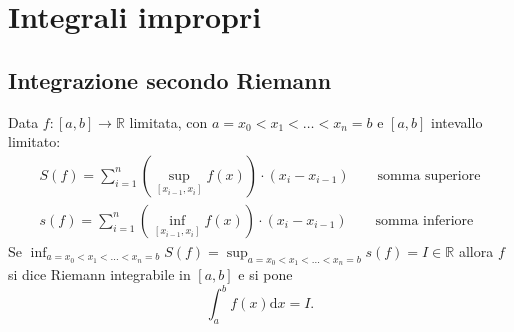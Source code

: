 \section{Integrali impropri}
\subsection{Integrazione secondo Riemann}

Data $f:[a,b] \rightarrow \mathbb{R}$ limitata, con $a=x_0 < x_1 < \ldots < x_n =b$ e $[a,b]$ intevallo limitato:
\begin{gather*}
	S(f) =\sum_{i=1}^{n} \left( \sup_{[x_{i-1},x_i]} f(x) \right) \cdot (x_i-x_{i-1}) \qquad \text{somma superiore}
	\\
	s(f) =\sum_{i=1}^{n} \left(\inf_{[x_{i-1},x_i]} f(x)\right)\cdot (x_i-x_{i-1}) \qquad \text{somma inferiore}
\end{gather*}
Se $\inf_{a=x_0 < x_1 < ... < x_n =b} S(f) = \sup_{a=x_0 < x_1 < ... < x_n =b} s(f) =I \in \mathbb{R}$ allora $f$ si dice Riemann integrabile in $[a,b]$ e si pone 
\begin{equation*}
	\int_{a}^{b} f(x) \mathrm{d}x=I.
\end{equation*}



